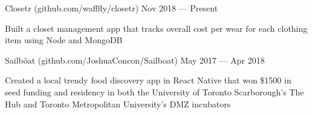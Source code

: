 \begin{cventries}
  \cventry
    {}
    {Closetr (github.com/wafffly/closetr)}
    {}
    {Nov 2018 --- Present}
    {}
    {
      \begin{cvitems}
        \item {Built a closet management app that tracks overall cost per wear for each clothing item using Node and MongoDB}
      \end{cvitems}
    }
  \cventry
    {}
    {Sailböat (github.com/JoshuaConcon/Sailboat)}
    {}
    {May 2017 --- Apr 2018}
    {}
    {
      \begin{cvitems}
        \item {Created a local trendy food discovery app in React Native that won \$1500 in seed funding and residency in both the University of Toronto Scarborough's The Hub and Toronto Metropolitan University's DMZ incubators}
      \end{cvitems}
    }
\end{cventries}